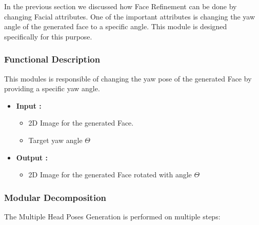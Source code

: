 In the previous section we discussed how Face Refinement can be done by changing Facial attributes. One of the important attributes is changing the yaw angle of the generated face to a specific angle. This module is designed specifically for this purpose.

\subsubsection{Functional Description}
This modules is responsible of changing the yaw pose of the generated Face by providing a specific yaw angle.

\begin{itemize}
    \item \textbf{Input :}
    \begin{itemize}
        \item 2D Image for the generated Face.
        \item Target yaw angle $\Theta$

    \end{itemize}
    \item \textbf{Output :}
    \begin{itemize}
        \item 2D Image for the generated Face rotated with angle $\Theta$
    \end{itemize}
\end{itemize}
\subsubsection{Modular Decomposition}

The Multiple Head Poses Generation is performed on multiple steps: \\

